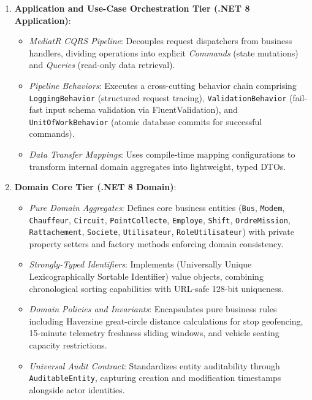 \begin{enumerate}
  \item \textbf{Application and Use-Case Orchestration Tier (.NET 8 Application)}:
  \begin{itemize}
    \item \emph{MediatR CQRS Pipeline}: Decouples request dispatchers from business handlers, dividing operations into explicit \emph{Commands} (state mutations) and \emph{Queries} (read-only data retrieval).
    \item \emph{Pipeline Behaviors}: Executes a cross-cutting behavior chain comprising \texttt{LoggingBehavior} (structured request tracing), \texttt{ValidationBehavior} (fail-fast input schema validation via FluentValidation), and \texttt{UnitOfWorkBehavior} (atomic database commits for successful commands).
    \item \emph{Data Transfer Mappings}: Uses compile-time  mapping configurations to transform internal domain aggregates into lightweight, typed DTOs.
  \end{itemize}

  \item \textbf{Domain Core Tier (.NET 8 Domain)}:
  \begin{itemize}
    \item \emph{Pure Domain Aggregates}: Defines core business entities (\texttt{Bus}, \texttt{Modem}, \texttt{Chauffeur}, \texttt{Circuit}, \texttt{PointCollecte}, \texttt{Employe}, \texttt{Shift}, \texttt{OrdreMission}, \texttt{Rattachement}, \texttt{Societe}, \texttt{Utilisateur}, \texttt{RoleUtilisateur}) with private property setters and factory methods enforcing domain consistency.
    \item \emph{Strongly-Typed Identifiers}: Implements  (Universally Unique Lexicographically Sortable Identifier) value objects, combining chronological sorting capabilities with URL-safe 128-bit uniqueness.
    \item \emph{Domain Policies and Invariants}: Encapsulates pure business rules including Haversine great-circle distance calculations for stop geofencing, 15-minute telemetry freshness sliding windows, and vehicle seating capacity restrictions.
    \item \emph{Universal Audit Contract}: Standardizes entity auditability through \texttt{AuditableEntity}, capturing creation and modification timestamps alongside actor identities.
  \end{itemize}


\end{enumerate}
